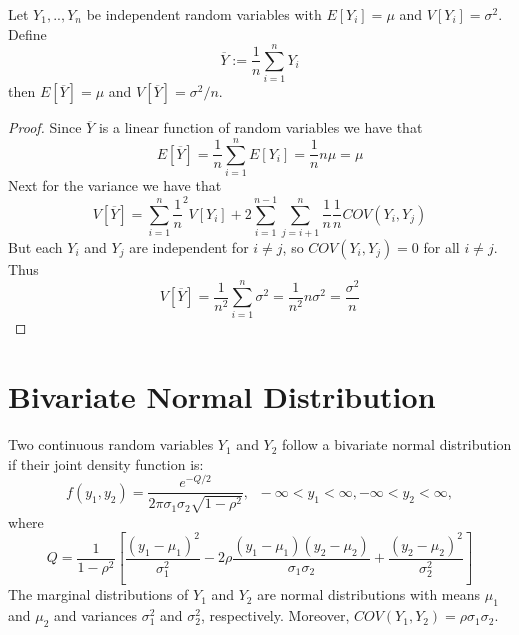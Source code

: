 \documentclass[12pt, a4paper, twoside, openright, titlepage]{book}
\begin{document}
\begin{claim}{}{}
    Let $Y_1,..,Y_n$ be independent random variables with $E[Y_i] = \mu$ and $V[Y_i] = \sigma^2$. Define \begin{equation*}
        \overline{Y} := \frac{1}{n}\sum\limits_{i=1}^nY_i
    \end{equation*}
    then $E[\overline{Y}] = \mu$ and $V[\overline{Y}] = \sigma^2/n$.
\end{claim}
\begin{proof}{}{}
    Since $\overline{Y}$ is a linear function of random variables we have that \begin{equation*}
        E[\overline{Y}] = \frac{1}{n}\sum\limits_{i=1}^nE[Y_i] = \frac{1}{n}n\mu = \mu
    \end{equation*}
    Next for the variance we have that \begin{equation*}
        V[\overline{Y}] = \sum\limits_{i=1}^n\frac{1}{n}^2V[Y_i] + 2\sum\limits_{i=1}^{n-1}\sum\limits_{j=i+1}^n\frac{1}{n}\frac{1}{n}COV(Y_i,Y_j)
    \end{equation*}
    But each $Y_i$ and $Y_j$ are independent for $i\neq j$, so $COV(Y_i,Y_j) = 0$ for all $ i \neq j$. Thus \begin{equation*}
        V[\overline{Y}] = \frac{1}{n^2}\sum\limits_{i=1}^n\sigma^2 = \frac{1}{n^2}n\sigma^2 = \frac{\sigma^2}{n}
    \end{equation*}
\end{proof}


\section{\textsection Bivariate Normal Distribution}

\begin{defn}{}{}
    Two continuous random variables $Y_1$ and $Y_2$ follow a bivariate normal distribution if their joint density function is: \begin{equation*}
        f(y_1,y_2) = \frac{e^{-Q/2}}{2\pi\sigma_1\sigma_2\sqrt{1-\rho^2}},\;\;-\infty < y_1 < \infty, -\infty < y_2 < \infty,
    \end{equation*}
    where \begin{equation*}
        Q = \frac{1}{1-\rho^2}\left[\frac{(y_1-\mu_1)^2}{\sigma_1^2} - 2\rho\frac{(y_1-\mu_1)(y_2-\mu_2)}{\sigma_1\sigma_2} + \frac{(y_2-\mu_2)^2}{\sigma_2^2}\right]
    \end{equation*}
    The marginal distributions of $Y_1$ and $Y_2$ are normal distributions with means $\mu_1$ and $\mu_2$ and variances $\sigma_1^2$ and $\sigma_2^2$, respectively. Moreover, $COV(Y_1,Y_2) = \rho\sigma_1\sigma_2$.
\end{defn}
\end{document}
